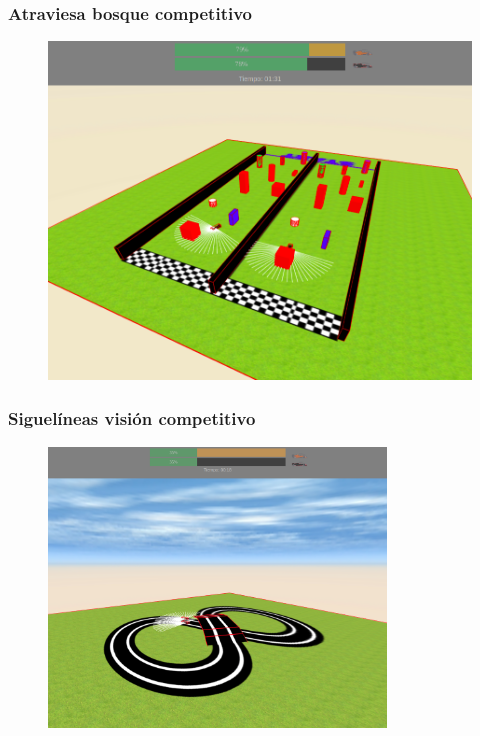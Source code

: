 \documentclass[xcolor={table}]{beamer}
\begin{document}
		\begin{frame}
			\frametitle{Atraviesa bosque competitivo}
						\begin{figure}{\textwidth}
             \includegraphics[scale=0.25]{img/evaluador_forest.png}
             \label{fig:configuracion}
            \end{figure}
		\end{frame}
		
		\begin{frame}
			\frametitle{Siguelíneas visión competitivo}
       \begin{figure}
         \href{https://youtu.be/OaA7_wsXhk8}
              {\includegraphics[width=0.8\textwidth]{img/evaluator_follow_line.png}}
       \end{figure}
		\end{frame}
		
\end{document}
